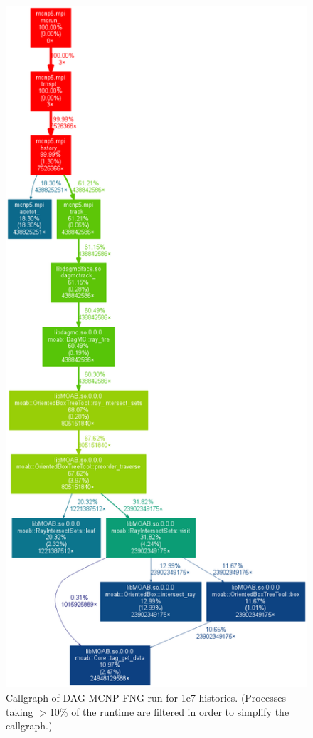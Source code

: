 \documentclass[12pt, a4paper]{article}
\begin{document}
\begin{figure}[H]
  \centering
  \caption{Callgraph of DAG-MCNP FNG run for 1e7 histories. (Processes taking $>$10\% of the runtime are filtered in order to simplify the callgraph.) }
  \label{dagmc-fng-coarse}
  \includegraphics[scale=0.35]{dagmc_fng_cg_coarse.png}
\end{figure}
\end{document}
